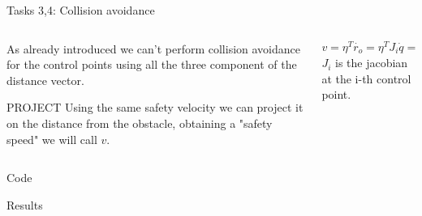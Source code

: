 \documentclass[11pt]{beamer}
\begin{document}
\begin{frame}{Tasks 3,4: Collision avoidance}
\begin{columns}
\begin{column}{.5\textwidth}
As already introduced we can't perform collision avoidance for the control points using all the three component of the distance vector.
\begin{block}{PROJECT}
Using the same safety velocity we can project it on the distance from the obstacle, obtaining a "safety speed" we will call $v$.
\end{block}
\end{column}
\begin{column}{.5\textwidth}
\begin{equation*}
v = \eta^T\dot{r_{o}} = \eta^T J_i\dot{q} = J_{c,i}\dot{q}
\end{equation*}
$J_i$ is the jacobian at the i-th control point.
\end{column}
\end{columns}
\end{frame}

\begin{frame}{Code}

\end{frame}

\begin{frame}{Results}

\end{frame}
\end{document}
